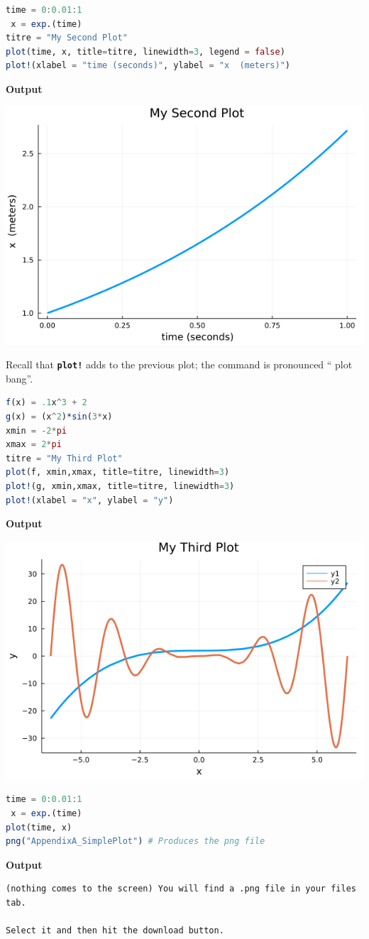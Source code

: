 \begin{lstlisting}[language=Julia,style=mystyle]
time = 0:0.01:1
 x = exp.(time)
titre = "My Second Plot" 
plot(time, x, title=titre, linewidth=3, legend = false)
plot!(xlabel = "time (seconds)", ylabel = "x  (meters)")
\end{lstlisting}
\textbf{Output} 
\begin{center}
\includegraphics[width=0.5\columnwidth]{graphics/AppA/AppendixA_BetterPlot.png}
\end{center}

Recall that \texttt{\bf plot!} adds to the previous plot; the command is pronounced `` plot bang''.

\begin{lstlisting}[language=Julia,style=mystyle]
f(x) = .1x^3 + 2
g(x) = (x^2)*sin(3*x) 
xmin = -2*pi
xmax = 2*pi
titre = "My Third Plot"
plot(f, xmin,xmax, title=titre, linewidth=3) 
plot!(g, xmin,xmax, title=titre, linewidth=3)
plot!(xlabel = "x", ylabel = "y") 
\end{lstlisting}
\textbf{Output} 
\begin{center}
\includegraphics[width=0.5\columnwidth]{graphics/AppA/AppendixA_ThirdPlot.png}
\end{center}

\begin{lstlisting}[language=Julia,style=mystyle]
time = 0:0.01:1
 x = exp.(time)
plot(time, x)
png("AppendixA_SimplePlot") # Produces the png file
\end{lstlisting}
\textbf{Output} 
\begin{verbatim}
(nothing comes to the screen) You will find a .png file in your files tab. 

Select it and then hit the download button.
\end{verbatim}

